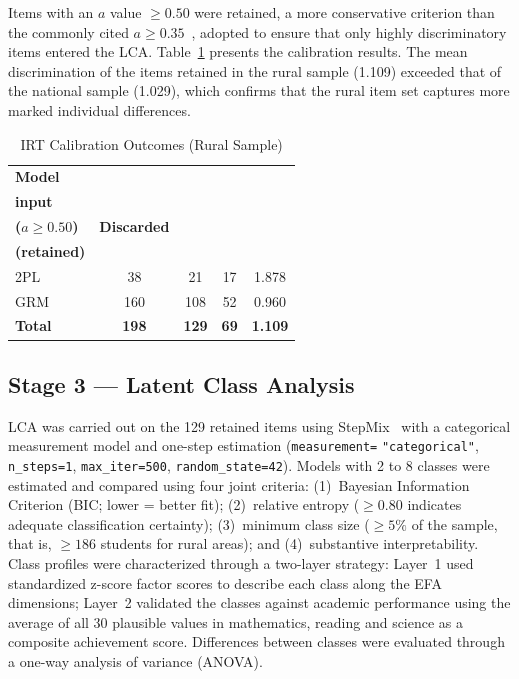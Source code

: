 \documentclass[runningheads]{llncs}
\begin{document}
Items with an \(a\) value $\geq 0.50$ were retained, a more
conservative criterion than the commonly cited
\(a \geq 0.35\)~\cite{vanderlinden2016irt}, adopted to ensure
that only highly discriminatory items entered the LCA.
Table~\ref{tab:irt_results} presents the calibration results.
The mean discrimination of the items retained in the rural
sample (1.109) exceeded that of the national sample (1.029),
which confirms that the rural item set captures more marked
individual differences.

\begin{table}[!htbp]
\centering
\caption{IRT Calibration Outcomes (Rural Sample)}
\label{tab:irt_results}
\begin{tabular}{lcccc}
\toprule
\textbf{Model} &
  \makecell{\textbf{Items} \\ \textbf{input}} &
  \makecell{\textbf{Retained}\\\textbf{($a \geq 0.50$)}} &
  \textbf{Discarded} &
  \makecell{\textbf{Mean}~$a$\\\textbf{(retained)}} \\
\midrule
2PL   &  38 &  21 &  17 & 1.878 \\
GRM   & 160 & 108 &  52 & 0.960 \\
\midrule
\textbf{Total} & \textbf{198} & \textbf{129} &
  \textbf{69} & \textbf{1.109} \\
\bottomrule
\end{tabular}
\end{table}

\subsection{Stage 3 --- Latent Class Analysis}

LCA was carried out on the 129 retained items using
StepMix~\cite{morin2025stepmix} with a categorical measurement
model and one-step estimation (\texttt{measurement=}
\texttt{"categorical"}, \texttt{n\_steps=1},
\texttt{max\_iter=500}, \texttt{random\_state=42}). Models with
2 to 8 classes were estimated and compared using four joint
criteria: (1)~Bayesian Information Criterion (BIC; lower =
better fit); (2)~relative entropy ($\geq 0.80$ indicates
adequate classification certainty); (3)~minimum class size
($\geq 5\%$ of the sample, that is, $\geq 186$ students for
rural areas); and (4)~substantive interpretability. Class
profiles were characterized through a two-layer strategy:
Layer~1 used standardized z-score factor scores to describe each
class along the EFA dimensions; Layer~2 validated the classes
against academic performance using the average of all 30
plausible values in mathematics, reading and science as a
composite achievement score. Differences between classes were
evaluated through a one-way analysis of variance (ANOVA).
\end{document}
